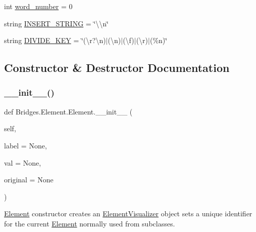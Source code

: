 \begin{DoxyCompactItemize}
\item 
int \mbox{\hyperlink{class_bridges_1_1_element_1_1_element_a857960f476b18de30baa18ae54877672}{word\+\_\+number}} = 0
\item 
string \mbox{\hyperlink{class_bridges_1_1_element_1_1_element_ab39bc7d8e0dc982c771602c6488f691e}{I\+N\+S\+E\+R\+T\+\_\+\+S\+T\+R\+I\+NG}} = \char`\"{}\textbackslash{}\textbackslash{}n\char`\"{}
\item 
string \mbox{\hyperlink{class_bridges_1_1_element_1_1_element_a73062c7f01d5cbac8f1ea19095904cda}{D\+I\+V\+I\+D\+E\+\_\+\+K\+EY}} = \char`\"{}(\textbackslash{}r?\textbackslash{}n)$\vert$(\textbackslash{}n)$\vert$(\textbackslash{}f)$\vert$(\textbackslash{}r)$\vert$(\%n)\char`\"{}
\end{DoxyCompactItemize}


\subsection{Constructor \& Destructor Documentation}
\mbox{\label{class_bridges_1_1_element_1_1_element_a3cf9af1f49a0e03f8e596c637836a7fe}} 
\subsubsection{\texorpdfstring{\+\_\+\+\_\+init\+\_\+\+\_\+()}{\_\_init\_\_()}}
{\footnotesize\ttfamily def Bridges.\+Element.\+Element.\+\_\+\+\_\+init\+\_\+\+\_\+ (\begin{DoxyParamCaption}\item[{}]{self,  }\item[{}]{label = {\ttfamily None},  }\item[{}]{val = {\ttfamily None},  }\item[{}]{original = {\ttfamily None} }\end{DoxyParamCaption})}



\mbox{\hyperlink{class_bridges_1_1_element_1_1_element}{Element}} constructor creates an \mbox{\hyperlink{namespace_bridges_1_1_element_visualizer}{Element\+Visualizer}} object sets a unique identifier for the current \mbox{\hyperlink{class_bridges_1_1_element_1_1_element}{Element}} normally used from subclasses. 


